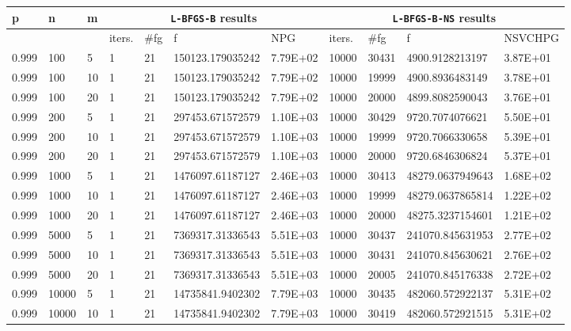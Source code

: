 \begin{table}
  \tiny
  \begin{center}
    \begin{tabular}{|l|l|l|l|l|l|l|l|l|l|l|}
      \hline
      p  & n & m  & \multicolumn{4}{|c|}{\texttt{L-BFGS-B} results} & \multicolumn{4}{|c|}{\texttt{L-BFGS-B-NS} results} \\ \hline
      &  &  & iters. & \#fg & f & NPG & iters. & \#fg & f & NSVCHPG \\ \hline
      0.999 & 100 & 5 & 1 & 21 & 150123.179035242 & 7.79E+02 & 10000 & 30431 & 4900.9128213197 & 3.87E+01 \\
      0.999 & 100 & 10 & 1 & 21 & 150123.179035242 & 7.79E+02 & 10000 & 19999 & 4900.8936483149 & 3.78E+01 \\ 
      0.999 & 100 & 20 & 1 & 21 & 150123.179035242 & 7.79E+02 & 10000 & 20000 & 4899.8082590043 & 3.76E+01 \\
      0.999 & 200 & 5 & 1 & 21 & 297453.671572579 & 1.10E+03 & 10000 & 30429 & 9720.7074076621 & 5.50E+01 \\
      0.999 & 200 & 10 & 1 & 21 & 297453.671572579 & 1.10E+03 & 10000 & 19999 & 9720.7066330658 & 5.39E+01 \\
      0.999 & 200 & 20 & 1 & 21 & 297453.671572579 & 1.10E+03 & 10000 & 20000 & 9720.6846306824 & 5.37E+01 \\
      0.999 & 1000 & 5 & 1 & 21 & 1476097.61187127 & 2.46E+03 & 10000 & 30413 & 48279.0637949643 & 1.68E+02 \\
      0.999 & 1000 & 10 & 1 & 21 & 1476097.61187127 & 2.46E+03 & 10000 & 19999 & 48279.0637865814 & 1.22E+02 \\
      0.999 & 1000 & 20 & 1 & 21 & 1476097.61187127 & 2.46E+03 & 10000 & 20000 & 48275.3237154601 & 1.21E+02 \\
      0.999 & 5000 & 5 & 1 & 21 & 7369317.31336543 & 5.51E+03 & 10000 & 30437 & 241070.845631953 & 2.77E+02 \\
      0.999 & 5000 & 10 & 1 & 21 & 7369317.31336543 & 5.51E+03 & 10000 & 30431 & 241070.845630621 & 2.76E+02 \\
      0.999 & 5000 & 20 & 1 & 21 & 7369317.31336543 & 5.51E+03 & 10000 & 20005 & 241070.845176338 & 2.72E+02 \\
      0.999 & 10000 & 5 & 1 & 21 & 14735841.9402302 & 7.79E+03 & 10000 & 30435 & 482060.572922137 & 5.31E+02 \\
      0.999 & 10000 & 10 & 1 & 21 & 14735841.9402302 & 7.79E+03 & 10000 & 30419 & 482060.572921515 & 5.31E+02 \\

\end{tabular}
\end{center}
\end{table}
